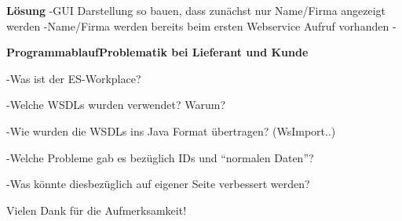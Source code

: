 \documentclass[xcolor=dvipsnames, compress, 10pt]{beamer}
\begin{document}
\textbf{Lösung}
-GUI Darstellung so bauen, dass zunächst nur Name/Firma angezeigt werden
-Name/Firma werden bereits beim ersten Webservice Aufruf vorhanden
-


\begin{frame}
\begin{center}
\textbf{ProgrammablaufProblematik bei Lieferant und Kunde}


\end{center}
\end{frame}

-Was ist der ES-Workplace?

-Welche WSDLs wurden verwendet? Warum?

-Wie wurden die WSDLs ins Java Format übertragen? (WsImport..)

-Welche Probleme gab es bezüglich IDs und ``normalen Daten''?

-Was könnte diesbezüglich auf eigener Seite verbessert werden?



\begin{frame}
\begin{center}
Vielen Dank f\"ur die Aufmerksamkeit!
\end{center}
\end{frame}
\end{document}

